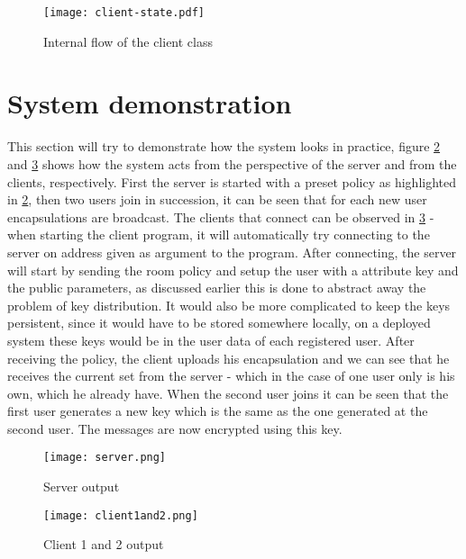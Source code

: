\begin{figure}
\centering
\texttt{[image: client-state.pdf]}
\caption{Internal flow of the client class}
\label{fig:client-state}
\end{figure}

\section{System demonstration}
This section will try to demonstrate how the system looks in practice, figure \ref{fig:server-output} and \ref{fig:client12-output} shows how the system acts from the perspective of the server and from the clients, respectively. First the server is started with a preset policy as highlighted in \ref{fig:server-output}, then two users join in succession, it can be seen that for each new user encapsulations are broadcast. The clients that connect can be observed in \ref{fig:client12-output} - when starting the client program, it will automatically try connecting to the server on address given as argument to the program. After connecting, the server will start by sending the room policy and setup the user with a attribute key and the public parameters, as discussed earlier this is done to abstract away the problem of key distribution. It would also be more complicated to keep the keys persistent, since it would have to be stored somewhere locally, on a deployed system these keys would be in the user data of each registered user. After receiving the policy, the client uploads his encapsulation and we can see that he receives the current set from the server - which in the case of one user only is his own, which he already have. When the second user joins it can be seen that the first user generates a new key which is the same as the one generated at the second user. The messages are now encrypted using this key.
\begin{figure}
\centering
\texttt{[image: server.png]}
\caption{Server output}
\label{fig:server-output}
\end{figure}

\begin{figure}
\centering
\texttt{[image: client1and2.png]}
\caption{Client 1 and 2 output}
\label{fig:client12-output}
\end{figure}
